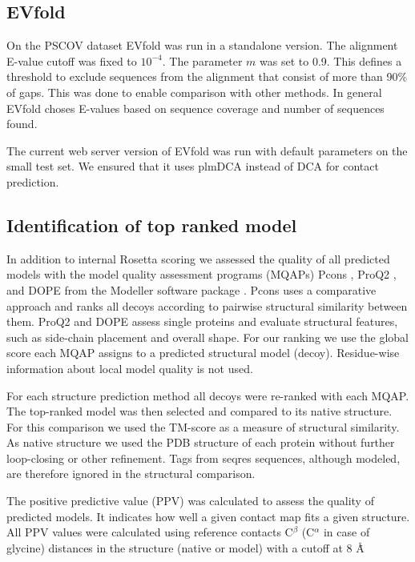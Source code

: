 \documentclass{bioinfo}
\begin{document}
\begin{methods}
\subsection{EVfold}
On the PSCOV dataset EVfold was run in a standalone version. The alignment E-value cutoff was fixed to $10^{-4}$. The parameter $m$ was set to 0.9. This defines a threshold to exclude sequences from the alignment that consist of more than 90\% of gaps. This was done to enable comparison with other methods. In general EVfold choses E-values based on sequence coverage and number of sequences found.

The current web server version of EVfold was run with default parameters on the small test set. We ensured that it uses plmDCA instead of DCA for contact prediction.

\subsection{Identification of top ranked model}

In addition to internal Rosetta scoring we assessed the quality of all
predicted models with the model quality assessment programs (MQAPs)
Pcons \cite[]{lundstrom_pcons:_2001}, ProQ2
\cite[]{ray_improved_2012}, and DOPE from the Modeller software
package \cite[]{eswar_comparative_2006}. Pcons uses a comparative
approach and ranks all decoys according to pairwise structural
similarity between them. ProQ2 and DOPE assess single proteins and
evaluate structural features, such as side-chain placement and overall
shape. For our ranking we use the global score each MQAP assigns to a
predicted structural model (decoy). Residue-wise information about
local model quality is not used. 

For each structure prediction method all decoys were re-ranked with
each MQAP. The top-ranked model was then selected and compared to its
native structure. For this comparison we used the TM-score
\cite[]{zhang_scoring_2004} as a measure of structural similarity. As
native structure we used the PDB structure of each protein without
further loop-closing or other refinement. Tags from seqres
sequences, although modeled, are therefore ignored in the structural
comparison.

The positive predictive value (PPV) was calculated to assess the quality of predicted models. It indicates how well a given contact map fits a given structure. All PPV values were calculated using reference contacts C$^{\beta}$ (C$^{\alpha}$ in case of glycine) distances in the structure (native or model) with a cutoff at 8 \AA\.



\end{methods}
\end{document}
